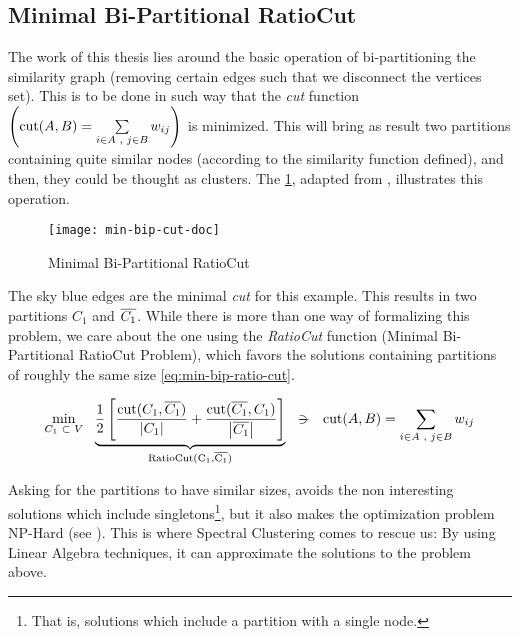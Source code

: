 \subsection{Minimal Bi-Partitional RatioCut}\label{sub:min-bip-rcut}

The work of this thesis lies around the basic operation of
bi-partitioning the similarity graph (removing certain edges such that we
disconnect the vertices set). This is to be done in such way that the
\emph{cut} function $\left(\operatorname{cut}(A,B) = \sum\limits_{\tiny{i \in A
    \ensuremath{\,\,,\,\,} j \in B}} w_{ij}\right)$ is minimized. This will bring as result
two partitions containing quite similar nodes (according to the similarity
function defined), and then, they could be thought as clusters. The
\cref{fig:min-bip-cut}, adapted from \cite{gao13}, illustrates this
operation.

\begin{figure}[H]
  \centering
  \caption{Minimal Bi-Partitional RatioCut}
  \label{fig:min-bip-cut}  
  \texttt{[image: min-bip-cut-doc]}
\end{figure}

The sky blue edges are the minimal \emph{cut} for this example. This results
in two partitions $C_1$ and $\overline{C_1}$. While there is more than
one way of formalizing this problem, we care about the one
using the \emph{RatioCut} function (Minimal Bi-Partitional RatioCut Problem),
which favors the solutions containing partitions of roughly
the same size \cref{eq:min-bip-ratio-cut}.

\begin{equation}
  \label{eq:min-bip-ratio-cut}
  \min\limits_{\tiny{C_1 \ds{\subset} V}} \ds{}
  \underbrace{      
    \frac{1}{2}
    \left[
      \dfrac{\func{cut}(C_1,\stcomp{C_1})}{\abs{C_1}} +
      \dfrac{\func{cut}(\stcomp{C_1},C_1)}{\abs{\stcomp{C_1}}}
      \right]
  }_{\func{RatioCut(C_1,\stcomp{C_1})}}
  \ds{\suchthat}
  \func{cut}(A,B) = \sum\limits_{\tiny{i \in A \ds{,} j \in B}} w_{ij}
\end{equation}
\joinbelow{1cm}

Asking for the partitions to have similar sizes, avoids the non
interesting solutions which include singletons\footnote{That is,
  solutions which include a partition with a single node.}, but it also  
makes the optimization problem NP-Hard (see
\cite{wagner93}). This 
is where Spectral Clustering comes to rescue us: By using Linear
Algebra techniques, it can approximate the solutions to the problem
above.

